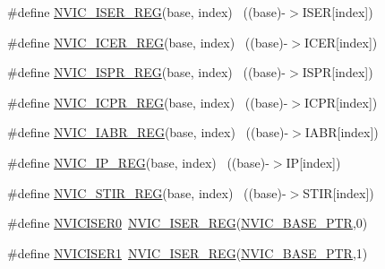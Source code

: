 \begin{DoxyCompactItemize}
\item 
\#define \hyperlink{group___n_v_i_c___register___accessor___macros_ga7009a9a09ee7fbb0b2af4cf99eadac4f}{N\+V\+I\+C\+\_\+\+I\+S\+E\+R\+\_\+\+R\+EG}(base,  index)                            ~((base)-\/$>$I\+S\+ER\mbox{[}index\mbox{]})
\item 
\#define \hyperlink{group___n_v_i_c___register___accessor___macros_gac8c6980a2505e16c70595552bc4da081}{N\+V\+I\+C\+\_\+\+I\+C\+E\+R\+\_\+\+R\+EG}(base,  index)                            ~((base)-\/$>$I\+C\+ER\mbox{[}index\mbox{]})
\item 
\#define \hyperlink{group___n_v_i_c___register___accessor___macros_ga6678e35df7fd1dd4a3f515e73983377c}{N\+V\+I\+C\+\_\+\+I\+S\+P\+R\+\_\+\+R\+EG}(base,  index)                            ~((base)-\/$>$I\+S\+PR\mbox{[}index\mbox{]})
\item 
\#define \hyperlink{group___n_v_i_c___register___accessor___macros_gac541bfbfb551d341170d1535a18208b9}{N\+V\+I\+C\+\_\+\+I\+C\+P\+R\+\_\+\+R\+EG}(base,  index)                            ~((base)-\/$>$I\+C\+PR\mbox{[}index\mbox{]})
\item 
\#define \hyperlink{group___n_v_i_c___register___accessor___macros_gafa3b717b76dfe3379645d3c4eaebaf6b}{N\+V\+I\+C\+\_\+\+I\+A\+B\+R\+\_\+\+R\+EG}(base,  index)                            ~((base)-\/$>$I\+A\+BR\mbox{[}index\mbox{]})
\item 
\#define \hyperlink{group___n_v_i_c___register___accessor___macros_gac7b3df65f95ff3ad60a655db439a45a2}{N\+V\+I\+C\+\_\+\+I\+P\+\_\+\+R\+EG}(base,  index)                                ~((base)-\/$>$IP\mbox{[}index\mbox{]})
\item 
\#define \hyperlink{group___n_v_i_c___register___accessor___macros_gae670827a5fdf3912afe9fa24578a19e3}{N\+V\+I\+C\+\_\+\+S\+T\+I\+R\+\_\+\+R\+EG}(base,  index)                            ~((base)-\/$>$S\+T\+IR\mbox{[}index\mbox{]})
\item 
\#define \hyperlink{group___n_v_i_c___register___accessor___macros_ga6467aada91ba0fd638339b74ced59aba}{N\+V\+I\+C\+I\+S\+E\+R0}~\hyperlink{group___n_v_i_c___register___accessor___macros_ga7009a9a09ee7fbb0b2af4cf99eadac4f}{N\+V\+I\+C\+\_\+\+I\+S\+E\+R\+\_\+\+R\+EG}(\hyperlink{group___n_v_i_c___peripheral_ga28f0a055d0c218e16d1fc7b13ff0caa5}{N\+V\+I\+C\+\_\+\+B\+A\+S\+E\+\_\+\+P\+TR},0)
\item 
\#define \hyperlink{group___n_v_i_c___register___accessor___macros_ga2d9a7764d0e41b6bb7bee2e00d6671fd}{N\+V\+I\+C\+I\+S\+E\+R1}~\hyperlink{group___n_v_i_c___register___accessor___macros_ga7009a9a09ee7fbb0b2af4cf99eadac4f}{N\+V\+I\+C\+\_\+\+I\+S\+E\+R\+\_\+\+R\+EG}(\hyperlink{group___n_v_i_c___peripheral_ga28f0a055d0c218e16d1fc7b13ff0caa5}{N\+V\+I\+C\+\_\+\+B\+A\+S\+E\+\_\+\+P\+TR},1)

\end{DoxyCompactItemize}
